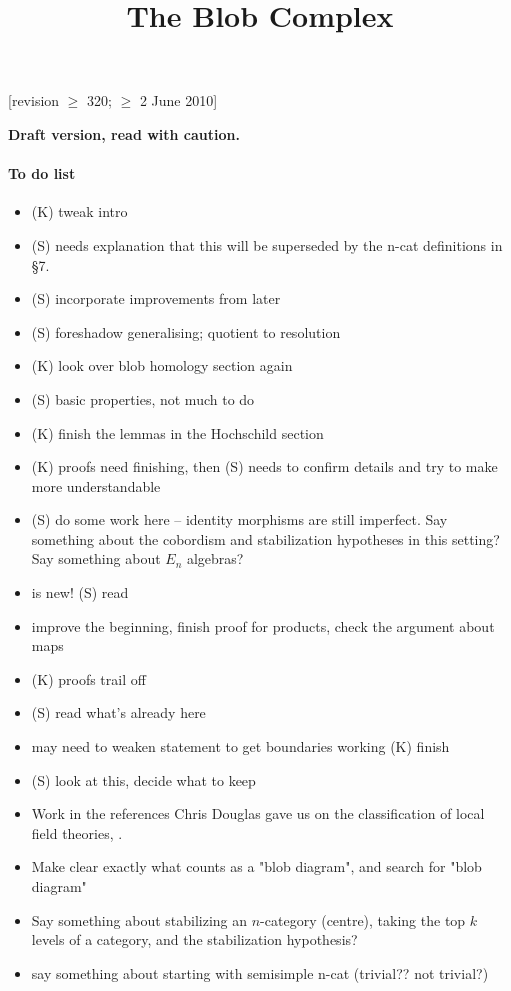 \documentclass[11pt,leqno]{article}
\title{The Blob Complex}
\begin{document}
\makeatletter
{}
\gdef\theequation{\thesection.\arabic{equation}}
\makeatother

\maketitle

[revision $\ge$ 320;  $\ge$ 2 June 2010]

\textbf{Draft version, read with caution.}


\paragraph{To do list}
\begin{itemize}
\item[1] (K) tweak intro
\item[2] (S) needs explanation that this will be superseded by the n-cat
definitions in \S 7.
\item[2] (S) incorporate improvements from later
\item[2.3] (S) foreshadow generalising; quotient to resolution
\item[3] (K) look over blob homology section again
\item[4] (S) basic properties, not much to do
\item[5] (K) finish the lemmas in the Hochschild section
\item[6] (K) proofs need finishing, then (S) needs to confirm details and try
to make more understandable
\item[7] (S) do some work here -- identity morphisms are still imperfect. Say something about the cobordism and stabilization hypotheses \cite{MR1355899} in this setting? Say something about $E_n$ algebras?
\item[7.6] is new! (S) read
\item[8] improve the beginning, finish proof for products,
check the argument about maps
\item[9] (K) proofs trail off
\item[10] (S) read what's already here
\item[A] may need to weaken statement to get boundaries working (K) finish
\item[B] (S) look at this, decide what to keep

\item Work in the references Chris Douglas gave us on the classification of local field theories, \cite{BDH-seminar,DSP-seminar,schommer-pries-thesis,0905.0465}.
\item Make clear exactly what counts as a "blob diagram", and search for
"blob diagram"

\item Say something about stabilizing an $n$-category (centre), taking the top $k$ levels of a category, and the stabilization hypothesis?

\item say something about starting with semisimple n-cat (trivial?? not trivial?)

\end{itemize}
\end{document}

